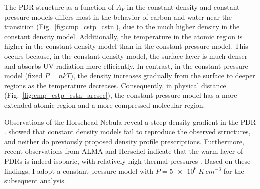 \documentclass[12pt,a4paper]{article}
\newcommand{\qt}[1]{}
\begin{document}


The PDR structure as a function of $A_V$ in the constant density and constant pressure models differs most in the behavior of carbon and water near the  transition (Fig.~\ref{fig:cmp_cstp_cstn}), due to the much higher density in the constant density model. Additionally, the temperature in the atomic region is higher in the constant density model than in the constant pressure model. This occurs because, in the constant density model, the surface layer is much denser and absorbs UV radiation more efficiently. In contrast, in the constant pressure model (fixed $P = nkT$), the density increases gradually from the surface to deeper regions as the temperature decreases. Consequently, in physical distance (Fig.~\ref{fig:cmp_cstp_cstn_arcsec}), the constant pressure model has a more extended atomic region and a more compressed molecular region.

Observations of the Horsehead Nebula reveal a steep density gradient in the PDR \parencite{Habart2005,Guzmán2011}. \textcite{HernándezVera2023} showed that constant density models fail to reproduce the observed structures, and neither do previously proposed density profile prescriptions. Furthermore, recent observations from ALMA and Herschel indicate that the warm layer of PDRs is indeed isobaric, with relatively high thermal pressures \parencite{Marconi1998,Goicoechea2016,Joblin2018,Wu2018,Bron2018,Maillard2021}. Based on these findings, I adopt a constant pressure model with $P = \qty{5e6}{K\,cm^{-3}}$ for the subsequent analysis.
\end{document}
